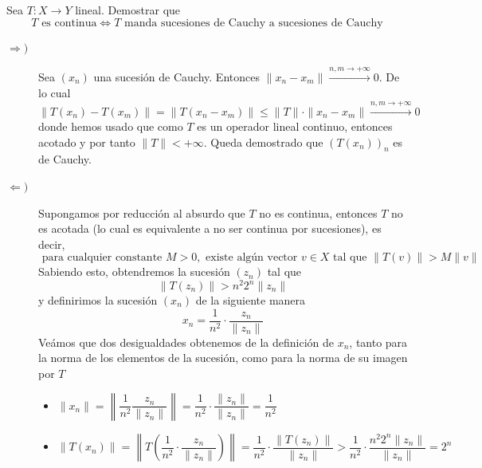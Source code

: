 \begin{ejercicio}
    Sea $T: X \to Y$ lineal. Demostrar que 
    \begin{equation*}
        T \text{ es continua} \iff T \text{ manda sucesiones de Cauchy a sucesiones de Cauchy}
    \end{equation*}
    \begin{description}
        \item[$\Longrightarrow)$] Sea $(x_n)$ una sucesión de Cauchy. Entonces $\|x_n - x_m\| \xrightarrow{n, m \to +\infty} 0$. De lo cual
        \begin{equation*}
            \|T(x_n) - T(x_m)\| = \|T(x_n - x_m)\| \leq \|T\| \cdot \|x_n - x_m\| \xrightarrow{n,m \to +\infty} 0
        \end{equation*}
        donde hemos usado que como $T$ es un operador lineal continuo, entonces acotado y por tanto $\|T\| < +\infty$. Queda demostrado que $(T(x_n))_n$ es de Cauchy. \\
        \item[$\Longleftarrow)$] Supongamos por reducción al absurdo que $T$ no es continua, entonces $T$ no es acotada (lo cual es equivalente a no ser continua por sucesiones), es decir, 
        \begin{equation*}
            \text{ para cualquier constante } M > 0, \text{ existe algún vector } v \in X \text{ tal que } \|T(v)\| > M\|v\|
        \end{equation*}
        Sabiendo esto, obtendremos la sucesión $(z_n)$ tal que 
        \begin{equation*}
            \|T(z_n)\| > n^2 2^n \|z_n\| 
        \end{equation*}
        y definirimos la sucesión $(x_n)$ de la siguiente manera
        \begin{equation*}
            x_n =\frac{1}{n^2}\cdot \frac{z_n}{\|z_n\|}
        \end{equation*}
        Veámos que dos desigualdades obtenemos de la definición de $x_n$, tanto para la norma de los elementos de la sucesión, como para la norma de su imagen por $T$
        \begin{itemize}
            \item $\|x_n\| = \left\| \dfrac{1}{n^2} \dfrac{z_n}{\|z_n\|} \right\| = \dfrac{1}{n^2} \cdot \dfrac{\|z_n\|}{\|z_n\|} = \dfrac{1}{n^2}$
            \item $\|T(x_n)\| = \left\| T\left( \dfrac{1}{n^2} \cdot \dfrac{z_n}{\|z_n\|} \right) \right\| = \dfrac{1}{n^2} \cdot \dfrac{\|T(z_n)\|}{\|z_n\|} > \dfrac{1}{n^2} \cdot \dfrac{n^2 2^n \|z_n\|}{\|z_n\|} = 2^n$

\end{itemize}
\end{description}
\end{ejercicio}
